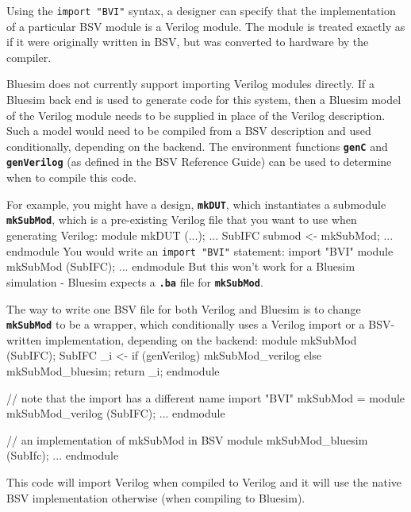 \documentclass{article}
\newcommand{\te}[1]{\texttt{#1}}
\newenvironment{centerboxverbatim}
  {\center
   \boxedverbatim}
  {\endboxedverbatim
  {\endcenter }}
\begin{document}
Using the \te{import "BVI"} syntax, a designer can specify that the
implementation of a particular BSV module is a Verilog module.  The
module is treated exactly as if it were originally written in BSV, but
was converted to hardware by the compiler.

Bluesim does not currently support importing Verilog modules
directly.  If a Bluesim back end is used to generate code for this
system,  then a
Bluesim model of the Verilog module  needs to be supplied in place
of the Verilog description.  Such a model would need to be compiled from a
BSV description and used conditionally, depending on the backend.  The
 environment
functions {\bf\tt genC} and {\bf\tt genVerilog} (as defined in the BSV
Reference Guide) can be used to determine when to compile this code.

For example, you might have a design, {\bf\tt mkDUT}, which
instantiates a submodule {\bf\tt mkSubMod}, which is a pre-existing
Verilog  file that you want to use when generating Verilog:
\begin{centerboxverbatim}
module mkDUT (...);
   ...
   SubIFC submod <- mkSubMod;
   ...
endmodule
\end{centerboxverbatim}
You would write an \te{import "BVI"} statement:
\begin{centerboxverbatim}
  import "BVI" module mkSubMod (SubIFC); ... endmodule
\end{centerboxverbatim}
But this won't work for a Bluesim simulation - Bluesim
expects a {\bf\tt .ba} file for {\bf\tt mkSubMod}.

The way to write one BSV file for both Verilog and Bluesim is to
change {\bf\tt mkSubMod} to be a wrapper, which conditionally uses a
Verilog  import or a BSV-written implementation, depending on the backend:
\begin{centerboxverbatim}
module mkSubMod (SubIFC);
   SubIFC _i <- if (genVerilog)
                   mkSubMod_verilog
                else
                   mkSubMod_bluesim;
   return _i;
endmodule

// note that the import has a different name
import "BVI" mkSubMod =
    module mkSubMod_verilog (SubIFC); ... endmodule

// an implementation of mkSubMod in BSV
module mkSubMod_bluesim (SubIfc);
   ...
endmodule
\end{centerboxverbatim}

This code will import Verilog when compiled to Verilog and
it will  use the native BSV implementation otherwise (when compiling
to Bluesim).
\end{document}
